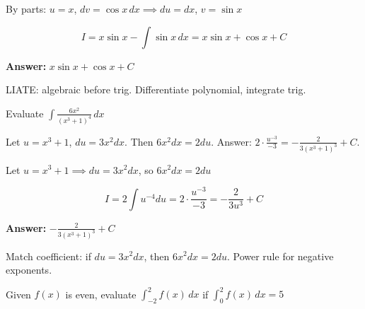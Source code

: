 \begin{solution}
By parts: $u=x$, $dv=\cos x\,dx \implies du=dx$, $v=\sin x$

\[
I = x\sin x - \int \sin x\,dx = x\sin x + \cos x + C
\]

\textbf{Answer:} $\boxed{x\sin x + \cos x + C}$
\end{solution}

\begin{takeaways}
LIATE: algebraic before trig. Differentiate polynomial, integrate trig.
\end{takeaways}

\vspace{1cm}

\begin{problem}
Evaluate $\displaystyle \int \frac{6x^2}{(x^3 + 1)^4} \, dx$
\end{problem}

\begin{hint}
Let $u = x^3 + 1$, $du = 3x^2 dx$. Then $6x^2 dx = 2du$. Answer: $2 \cdot \frac{u^{-3}}{-3} = -\frac{2}{3(x^3+1)^3} + C$.
\end{hint}

\begin{solution}
Let $u = x^3+1 \implies du = 3x^2dx$, so $6x^2dx = 2du$

\[
I = 2\int u^{-4}du = 2 \cdot \frac{u^{-3}}{-3} = -\frac{2}{3u^3} + C
\]

\textbf{Answer:} $\boxed{-\frac{2}{3(x^3+1)^3} + C}$
\end{solution}

\begin{takeaways}
Match coefficient: if $du=3x^2dx$, then $6x^2dx=2du$. Power rule for negative exponents.
\end{takeaways}

\vspace{1cm}

\begin{problem}
Given $f(x)$ is even, evaluate $\displaystyle \int_{-2}^{2} f(x) \, dx$ if $\displaystyle \int_0^2 f(x) \, dx = 5$
\end{problem}

